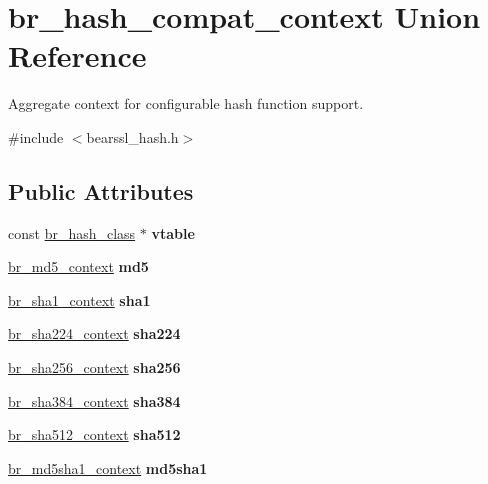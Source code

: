 \hypertarget{unionbr__hash__compat__context}{}\section{br\+\_\+hash\+\_\+compat\+\_\+context Union Reference}
\label{unionbr__hash__compat__context}


Aggregate context for configurable hash function support.  




{\ttfamily \#include $<$bearssl\+\_\+hash.\+h$>$}

\subsection*{Public Attributes}
\begin{DoxyCompactItemize}
\item 
\mbox{\label{unionbr__hash__compat__context_abe61a5c42a2c8848d19b1c311b1a7226}} 
const \hyperlink{bearssl__hash_8h_ae38c1b9d539537cc16fc84388b922d86}{br\+\_\+hash\+\_\+class} $\ast$ {\bfseries vtable}
\item 
\mbox{\label{unionbr__hash__compat__context_aabed12108c366dc6ae6e7e7ffd29ad0e}} 
\hyperlink{structbr__md5__context}{br\+\_\+md5\+\_\+context} {\bfseries md5}
\item 
\mbox{\label{unionbr__hash__compat__context_aef84a325795310c735e5fa0506745bb5}} 
\hyperlink{structbr__sha1__context}{br\+\_\+sha1\+\_\+context} {\bfseries sha1}
\item 
\mbox{\label{unionbr__hash__compat__context_a663e3121f91ed413facef2b07d459750}} 
\hyperlink{structbr__sha224__context}{br\+\_\+sha224\+\_\+context} {\bfseries sha224}
\item 
\mbox{\label{unionbr__hash__compat__context_a5a7bfce9e56effdb6c5ae3873bd428dc}} 
\hyperlink{structbr__sha224__context}{br\+\_\+sha256\+\_\+context} {\bfseries sha256}
\item 
\mbox{\label{unionbr__hash__compat__context_a5d025b028c559b30ab978af5167e878f}} 
\hyperlink{structbr__sha384__context}{br\+\_\+sha384\+\_\+context} {\bfseries sha384}
\item 
\mbox{\label{unionbr__hash__compat__context_a695c3f128e3b889d0978d9f869fd0230}} 
\hyperlink{structbr__sha384__context}{br\+\_\+sha512\+\_\+context} {\bfseries sha512}
\item 
\mbox{\label{unionbr__hash__compat__context_a8d5e8bca26e046845b037d366131ea9e}} 
\hyperlink{structbr__md5sha1__context}{br\+\_\+md5sha1\+\_\+context} {\bfseries md5sha1}
\end{DoxyCompactItemize}


